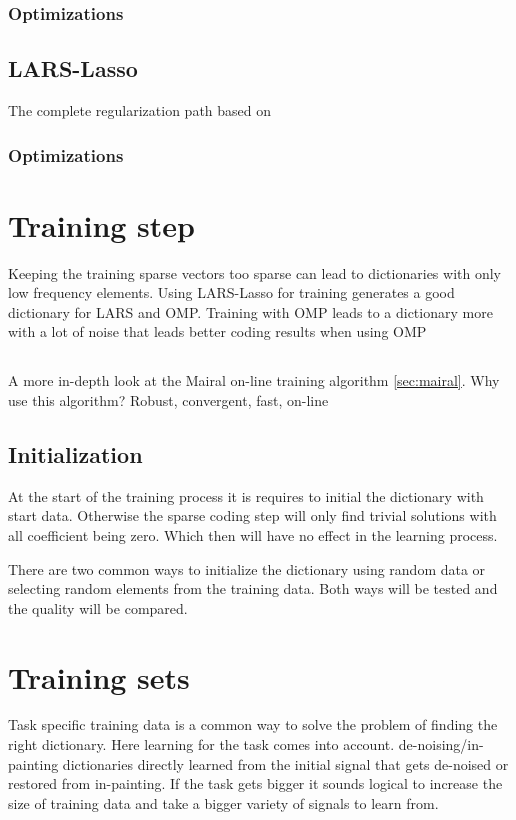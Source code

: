 \subsubsection*{Optimizations}


\subsection{LARS-Lasso}
The complete regularization path based on \cite{Efron2004}
\subsubsection*{Optimizations}


\section{Training step}
Keeping the training sparse vectors too sparse can lead to dictionaries with only low frequency elements.
Using LARS-Lasso for training generates a good dictionary for LARS and OMP. 
Training with OMP leads to a dictionary more with a lot of noise 
that leads better coding results when using OMP 

\subsection{\trainDL}
A more in-depth look at the Mairal on-line training algorithm \ref{sec:mairal}. 
Why use this algorithm? Robust, convergent, fast, on-line

\subsection{Initialization}
At the start of the training process it is requires to initial the dictionary with start data.
Otherwise the sparse coding step will only find trivial solutions with all coefficient being zero. Which then will have no effect in the learning process.

There are two common ways to initialize the dictionary using random data or selecting random elements from the training data. Both ways will be tested and 
the quality will be compared.

\section{Training sets}
Task specific training data is a common way to solve the problem of finding the right dictionary. 
Here learning for the task comes into account. de-noising/in-painting dictionaries directly learned from the initial
signal that gets de-noised or restored from in-painting.
If the task gets bigger it sounds logical to increase the size of training data and take a bigger variety of signals to learn from.


